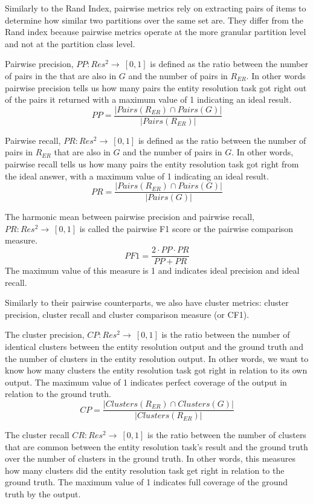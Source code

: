 Similarly to the Rand Index, pairwise metrics rely on extracting pairs of items
to determine how similar two partitions over the same set are.
They differ from the Rand index because pairwise metrics operate at the more
granular partition level and not at the partition class level.

Pairwise precision, $PP:Res^2\rightarrow~\left[0,1\right]$ is defined as the
ratio between the number of pairs in the  that are also in $G$ and the number
of pairs in $R_{ER}$.
In other words pairwise precision tells us how many pairs the entity
resolution task got right out of the pairs it returned with a maximum value of
1 indicating an ideal result.
\[
    PP = \frac{|Pairs(R_{ER}) \cap Pairs(G)|}{|Pairs(R_{ER})|}
\]

Pairwise recall, $PR:Res^2\rightarrow~\left[0,1\right]$ is defined as the ratio
between the number of pairs in $R_{ER}$ that are also in $G$ and the number of
pairs in $G$.
In other words, pairwise recall tells us how many pairs the entity
resolution task got right from the ideal answer, with a maximum value of 1
indicating an ideal result.
\[
    PR = \frac{|Pairs(R_{ER}) \cap Pairs(G)|}{|Pairs(G)|}
\]

The harmonic mean between pairwise precision and pairwise recall,
$PR:Res^2\rightarrow~\left[0,1\right]$ is called the pairwise F1 score or the
pairwise comparison measure\cite{Men10}.
\[
    PF1=\frac{2 \cdot PP \cdot PR}{PP + PR}
\]
The maximum value of this measure is 1 and indicates ideal precision and ideal
recall.

Similarly to their pairwise counterparts, we also have cluster metrics: cluster
precision, cluster recall and cluster comparison measure (or CF1).

The cluster precision, $CP:Res^2\rightarrow~\left[0,1\right]$ is the ratio
between the number of identical clusters between the entity resolution output
and the ground truth and the number of clusters in the entity resolution output.
In other words, we want to know how many clusters the entity resolution task
got right in relation to its own output.
The maximum value of 1 indicates perfect coverage of the output in relation to
the ground truth.
\[
    CP=\frac{|Clusters(R_{ER}) \cap Clusters(G)|}{|Clusters(R_{ER})|}
\]

The cluster recall $CR:Res^2\rightarrow~\left[0,1\right]$ is the ratio between
the number of clusters that are common between the entity resolution task's
result and the ground truth over the number of clusters in the ground truth.
In other words, this measures how many clusters did the entity resolution
task get right in relation to the ground truth.
The maximum value of 1 indicates full coverage of the ground truth by the
output.

